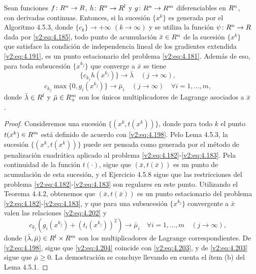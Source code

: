 \begin{theorem}\label{v2:thm:4.5.4}
    Sean funciones $f \colon R^n \to R$, $h \colon R^n \to R^l$ y $g \colon R^n \to R^m$ diferenciables en $R^n$, con derivadas continuas.
    Entonces, si la sucesión $\{x^k\}$ es generada por el Algoritmo 4.5.3, donde $\{c_k\} \to +\infty$ $(k \to \infty)$ y se utiliza la función $\psi \colon R^n \to R$ dada por \eqref{v2:eq:4.185}, todo punto de acumulación $\bar{x} \in R^n$ de la sucesión $\{x^k\}$ que satisface la condición de independencia lineal de los gradientes extendida \eqref{v2:eq:4.191}, es un punto estacionario del problema \eqref{v2:eq:4.181}.
    Además de eso, para toda subsucesión $\{x^{k_j}\}$ que converge a $\bar{x}$ se tiene
    \begin{equation}
        \{c_{k_j} h(x^{k_j})\} \to \bar{\lambda} \quad (j \to \infty),
        \label{v2:eq:4.202}
    \end{equation}
    \begin{equation}
        c_{k_j} \max\{0, g_i(x^{k_j})\} \to \bar{\mu}_i \quad (j \to \infty) \quad \forall i = 1, \dots, m,
        \label{v2:eq:4.203}
    \end{equation}
    donde $\bar{\lambda} \in R^l$ y $\bar{\mu} \in R^m_+$ son los únicos multiplicadores de Lagrange asociados a $\bar{x}$.
\end{theorem}
\begin{proof}
    Consideremos una sucesión $\{(x^k, t(x^k))\}$, donde para todo $k$ el punto $t(x^k) \in R^m$ está definido de acuerdo con \eqref{v2:eq:4.198}. Pelo Lema 4.5.3, la sucesión $\{(x^k, t(x^k))\}$ puede ser pensada como generada por el método de penalización cuadrática aplicado al problema \eqref{v2:eq:4.182}-\eqref{v2:eq:4.183}. Pela continuidad de la función $t(\cdot)$, sigue que $(\bar{x}, t(\bar{x}))$ es un punto de acumulación de esta sucesión, y el Ejercicio 4.5.8 sigue que las restricciones del problema \eqref{v2:eq:4.182}-\eqref{v2:eq:4.183} son regulares en este punto.
    Utilizando el Teorema 4.4.2, obtenemos que $(\bar{x}, t(\bar{x}))$ es un punto estacionario del problema \eqref{v2:eq:4.182}-\eqref{v2:eq:4.183}, y que para una subsucesión $\{x^{k_j}\}$ convergente a $\bar{x}$ valen las relaciones \eqref{v2:eq:4.202} y
    \begin{equation}
        c_{k_j}(g_i(x^{k_j}) + (t_i(x^{k_j}))^2) \to \bar{\mu}_i \quad \forall i = 1, \dots, m \quad (j \to \infty),
        \label{v2:eq:4.204}
    \end{equation}
    donde $(\bar{\lambda}, \bar{\mu}) \in R^l \times R^m$ son los multiplicadores de Lagrange correspondientes. De \eqref{v2:eq:4.198}, sigue que \eqref{v2:eq:4.204} coincide con \eqref{v2:eq:4.203}, y de \eqref{v2:eq:4.203} sigue que $\bar{\mu} \ge 0$.
    La demostración se concluye llevando en cuenta el ítem (b) del Lema 4.5.1.
\end{proof}

